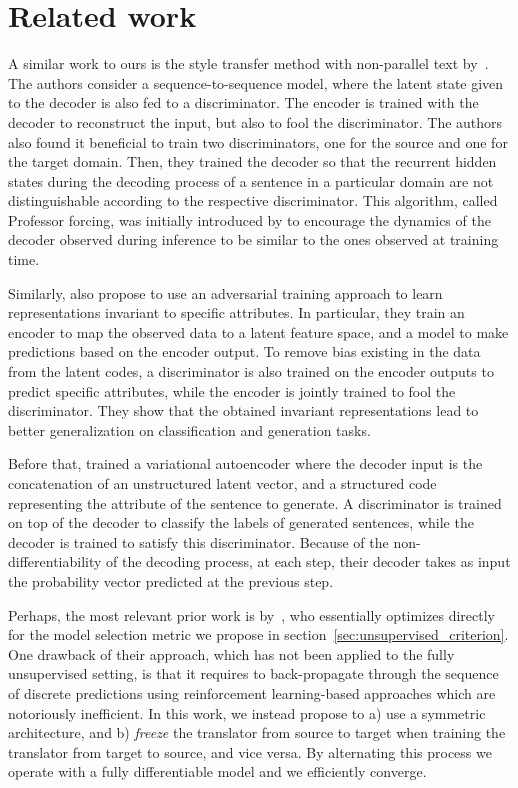 \section{Related work}
\label{sec:related_work}

A similar work to ours is the style transfer method with non-parallel text by~\citet{shen2017style}. The authors consider a sequence-to-sequence model, where the latent state given to the decoder is also fed to a discriminator. The encoder is trained with the decoder to reconstruct the input, but also to fool the discriminator. The authors also found it beneficial to train two discriminators, one for the source and one for the target domain. Then, they trained the decoder so that the recurrent hidden states during the decoding process of a sentence in a particular domain are not distinguishable according to the respective discriminator. This algorithm, called Professor forcing, was initially introduced by \citet{lamb2016professor} to encourage the dynamics of the decoder observed during inference to be similar to the ones observed at training time.

Similarly, \citet{xie2017controllable} also propose to use an adversarial training approach to learn representations invariant to specific attributes. In particular, they train an encoder to map the observed data to a latent feature space, and a model to make predictions based on the encoder output. To remove bias existing in the data from the latent codes, a discriminator is also trained on the encoder outputs to predict specific attributes, while the encoder is jointly trained to fool the discriminator. They show that the obtained invariant representations lead to better generalization on classification and generation tasks.

Before that, \citet{hu2017controllable} trained a variational autoencoder \citep{kingma2013auto} where the decoder input is the concatenation of an unstructured latent vector, and a structured code representing the attribute of the sentence to generate. A discriminator is trained on top of the decoder to classify the labels of generated sentences, while the decoder is trained to satisfy this discriminator. Because of the non-differentiability of the decoding process, at each step, their decoder takes as input the probability vector predicted at the previous step.

Perhaps, the most relevant prior work is by~\cite{he2016dual}, who essentially optimizes directly for the model selection metric we propose in section~\ref{sec:unsupervised_criterion}. One drawback of their approach, which has not been applied to the fully unsupervised setting, is that it requires to back-propagate through the sequence of discrete predictions using reinforcement learning-based approaches which are notoriously inefficient. In this work, we instead propose to a) use a symmetric architecture, and b) \textit{freeze} the translator from source to target when training the translator from target to source, and vice versa. By alternating this process we operate with a fully differentiable model and we efficiently converge.

